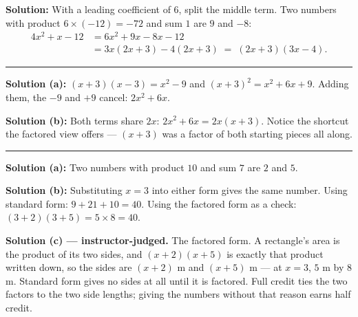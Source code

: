 \documentclass[12pt]{article}
\begin{document}
\textbf{Solution:} \quad With a leading coefficient of $6$, split the middle term. Two numbers with
product $6\times(-12) = -72$ and sum $1$ are $9$ and $-8$:
\begin{align*}
  4x^2 + x - 12 &= 6x^2 + 9x - 8x - 12\\
                &= 3x(2x + 3) - 4(2x + 3) \;=\; (2x + 3)(3x - 4).
\end{align*}

\vspace{0.15cm}\noindent\rule{\linewidth}{0.2pt}


\textbf{Solution (a):} \quad $(x+3)(x-3) = x^2 - 9$ and $(x+3)^2 = x^2 + 6x + 9$. Adding them, the
$-9$ and $+9$ cancel: $2x^2 + 6x$. 

\noindent\textbf{Solution (b):} \quad Both terms share $2x$: $2x^2 + 6x = 2x(x + 3)$. Notice the
shortcut the factored view offers --- $(x+3)$ was a factor of both starting pieces all along.

\vspace{0.15cm}\noindent\rule{\linewidth}{0.2pt}


\textbf{Solution (a):} \quad Two numbers with product $10$ and sum $7$ are $2$ and $5$.

\noindent\textbf{Solution (b):} \quad Substituting $x = 3$ into either form gives the same number.
Using standard form: $9 + 21 + 10 = 40$. Using the factored form as a check:
$(3+2)(3+5) = 5\times 8 = 40$. 

\noindent\textbf{Solution (c) --- instructor-judged.} The factored form. A rectangle's area is the
product of its two sides, and $(x+2)(x+5)$ is exactly that product written down, so the sides are
$(x+2)$ m and $(x+5)$ m --- at $x = 3$, $5$ m by $8$ m. Standard form gives no sides at all until
it is factored. Full credit ties the two factors to the two side lengths; giving the numbers
without that reason earns half credit.
\end{document}
